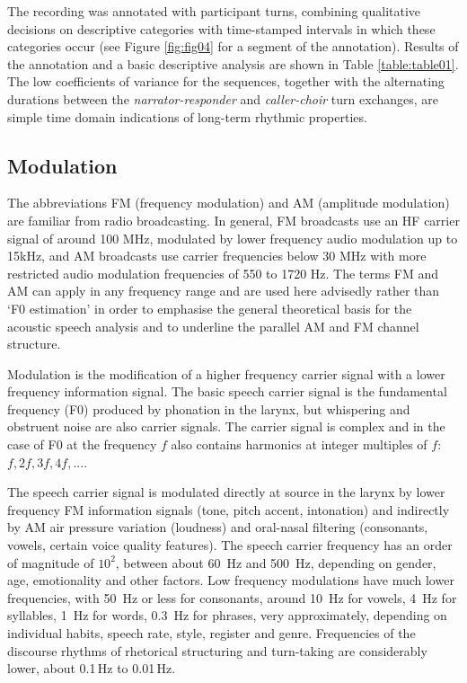 \documentclass[output=paper,colorlinks,citecolor=brown
]{langscibook}
\begin{document}
The recording was annotated with participant turns, combining qualitative decisions on descriptive categories with time-stamped intervals in which these categories occur (see Figure \ref{fig:fig04} for a segment of the annotation). Results of the annotation and a basic descriptive analysis are shown in Table \ref{table:table01}. The low coefficients of variance for the sequences, together with the alternating durations between the \textit{narrator-responder} and \textit{caller-choir} turn exchanges, are simple time domain indications of long-term rhythmic properties.

\subsection{Modulation}

The abbreviations FM (frequency modulation) and AM (amplitude modulation) are familiar from radio broadcasting. In general, FM broadcasts use an HF carrier signal of around 100 MHz, modulated by lower frequency audio modulation up to 15kHz, and AM broadcasts use carrier frequencies below 30 MHz with more restricted audio modulation frequencies of 550 to 1720 Hz. The terms FM and AM can apply in any frequency range and are used here advisedly rather than `F0 estimation' in order to emphasise the general theoretical basis for the acoustic speech analysis and to underline the parallel AM and FM channel structure.

Modulation is the modification of a higher frequency carrier signal with a lower frequency information signal. The basic speech carrier signal is the fundamental frequency (F0) produced by phonation in the larynx, but whispering and obstruent noise are also carrier signals. The carrier signal is complex and in the case of F0 at the frequency $f$ also contains harmonics at integer multiples of $f$: $f, 2f, 3f, 4f, ...$.

The speech carrier signal is modulated directly at source in the larynx by lower frequency FM information signals (tone, pitch accent, intonation) and indirectly by AM air pressure variation (loudness) and oral-nasal filtering (consonants, vowels, certain voice quality features). The speech carrier frequency has an order of magnitude of $10^2$, between about 60~Hz and 500~Hz, depending on gender, age, emotionality and other factors. Low frequency modulations have much lower frequencies, with 50~Hz or less for consonants, around 10~Hz for vowels, 4~Hz for syllables, 1~Hz for words, 0.3~Hz for phrases, very approximately, depending on individual habits, speech rate, style, register and genre. Frequencies of the discourse rhythms of rhetorical structuring and turn-taking are considerably lower, about 0.1\,Hz to 0.01\,Hz.
\end{document}
